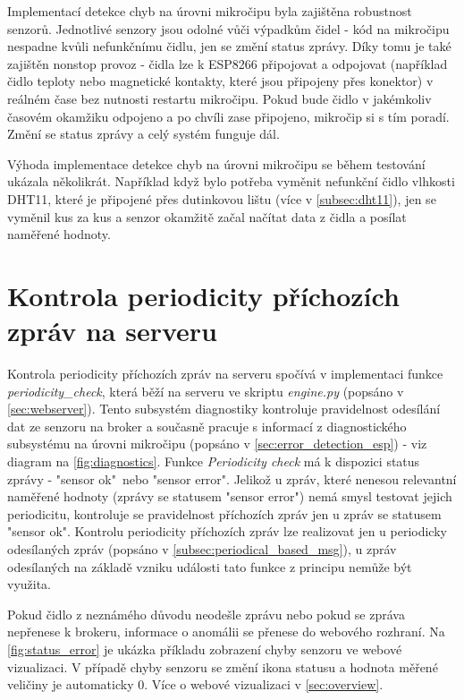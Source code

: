 Implementací detekce chyb na úrovni mikročipu byla zajištěna robustnost senzorů. Jednotlivé senzory jsou odolné vůči výpadkům čidel - kód na mikročipu nespadne kvůli nefunkčnímu čidlu, jen se změní status zprávy. Díky tomu je také zajištěn nonstop provoz - čidla lze k ESP8266 připojovat a odpojovat (například čidlo teploty nebo magnetické kontakty, které jsou připojeny přes konektor) v reálném čase bez nutnosti restartu mikročipu. Pokud bude čidlo v jakémkoliv časovém okamžiku odpojeno a po chvíli zase připojeno, mikročip si s tím poradí. Změní se status zprávy a celý systém funguje dál. \par
Výhoda implementace detekce chyb na úrovni mikročipu se během testování ukázala několikrát. Například když bylo potřeba vyměnit nefunkční čidlo vlhkosti DHT11, které je připojené přes dutinkovou lištu (více v \cref{subsec:dht11}), jen se vyměnil kus za kus a senzor okamžitě začal načítat data z čidla a posílat naměřené hodnoty.

\section{Kontrola periodicity příchozích zpráv na \mbox{serveru}} \label{sec:periodicity_check}
Kontrola periodicity příchozích zpráv na serveru spočívá v implementaci funkce \textit{periodicity\_check}, která běží na serveru ve skriptu \textit{engine.py} (popsáno v \cref{sec:webserver}). Tento subsystém diagnostiky kontroluje pravidelnost odesílání dat ze senzoru na broker a současně pracuje s informací z diagnostického subsystému na úrovni mikročipu (popsáno v \cref{sec:error_detection_esp}) - viz diagram na \cref{fig:diagnostics}. Funkce \textit{Periodicity check} má k dispozici status zprávy - "sensor ok"\ nebo "sensor error". Jelikož u zpráv, které nenesou relevantní naměřené hodnoty (zprávy se statusem "sensor error") nemá smysl testovat jejich periodicitu, kontroluje se pravidelnost příchozích zpráv jen u zpráv se statusem "sensor ok". Kontrolu periodicity příchozích zpráv lze realizovat jen u periodicky odesílaných zpráv (popsáno v \cref{subsec:periodical_based_msg}), u zpráv odesílaných na základě vzniku události tato funkce z principu nemůže být využita. \par 
Pokud čidlo z neznámého důvodu neodešle zprávu nebo pokud se zpráva nepřenese k brokeru, informace o anomálii se přenese do webového rozhraní. Na \cref{fig:status_error} je ukázka příkladu zobrazení chyby senzoru ve webové vizualizaci. V případě chyby senzoru se změní ikona statusu a hodnota měřené veličiny je automaticky 0. Více o webové vizualizaci v \cref{sec:overview}.

